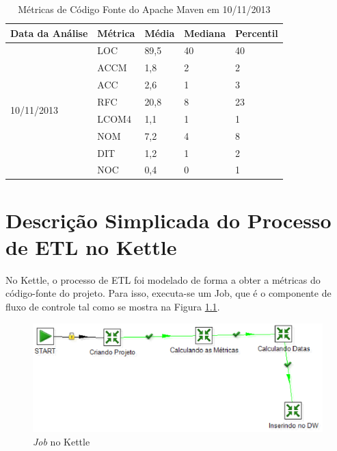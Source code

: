 \begin{apendicesenv}
\begin{table}[ht]
\centering
\begin{tabular}{|l|l|l|l|l|}
\hline
Data da Análise             & Métrica & Média & Mediana & Percentil \\ \hline
\multirow{8}{*}{10/11/2013} & LOC     & 89,5  & 40      & 40        \\ \cline{2-5} 
                            & ACCM    & 1,8   & 2       & 2         \\ \cline{2-5} 
                            & ACC     & 2,6   & 1       & 3         \\ \cline{2-5} 
                            & RFC     & 20,8  & 8       & 23        \\ \cline{2-5} 
                            & LCOM4   & 1,1   & 1       & 1         \\ \cline{2-5} 
                            & NOM     & 7,2   & 4       & 8         \\ \cline{2-5} 
                            & DIT     & 1,2   & 1       & 2         \\ \cline{2-5} 
                            & NOC     & 0,4   & 0       & 1         \\ \hline
\end{tabular}
\label{03/11}
\caption{Métricas de Código Fonte do Apache Maven em 10/11/2013}
\end{table}


\chapter{Descrição Simplicada do Processo de ETL no Kettle}

\label{implementação}

No Kettle, o processo de ETL foi modelado de forma a obter a métricas do código-fonte do projeto. Para isso, executa-se um Job, que é o componente de fluxo de controle tal como se mostra na Figura \ref{job}.


\begin{figure}[ht!]
\centering
\includegraphics[keepaspectratio=false,scale=0.60]{figuras/job.eps}
\caption{\textit{Job} no Kettle}
\label{job}
\end{figure}
\FloatBarrier


\end{apendicesenv}

